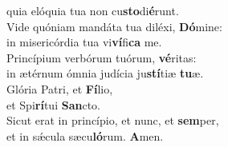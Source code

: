 \evenverse quia elóquia tua non cu\textbf{sto}di\textbf{é}runt.\\
\oddverse Vide quóniam mandáta tua diléxi, \textbf{Dó}mine:~\*\\
\oddverse in misericórdia tua vi\textbf{ví}fi\textbf{ca} me.\\
\evenverse Princípium verbórum tuórum, \textbf{vé}ritas:~\*\\
\evenverse in ætérnum ómnia judícia ju\textbf{stí}tiæ \textbf{tu}æ.\\
\oddverse Glória Patri, et \textbf{Fí}lio,~\*\\
\oddverse et Spi\textbf{rí}tui \textbf{San}cto.\\
\evenverse Sicut erat in princípio, et nunc, et \textbf{sem}per,~\*\\
\evenverse et in sǽcula sæcu\textbf{ló}rum. \textbf{A}men.\\
